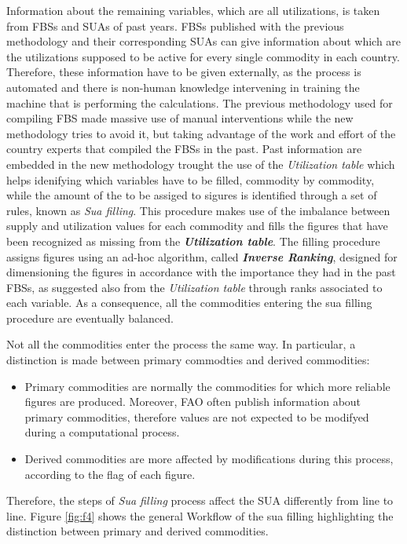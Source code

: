 \documentclass[]{article}
\providecommand{\tightlist}{%
  \setlength{\itemsep}{0pt}\setlength{\parskip}{0pt}}
\begin{document}
Information about the remaining variables, which are all utilizations,
is taken from FBSs and SUAs of past years. FBSs published with the
previous methodology and their corresponding SUAs can give information
about which are the utilizations supposed to be active for every single
commodity in each country.\\
Therefore, these information have to be given externally, as the process
is automated and there is non-human knowledge intervening in training
the machine that is performing the calculations. The previous
methodology used for compiling FBS made massive use of manual
interventions while the new methodology tries to avoid it, but taking
advantage of the work and effort of the country experts that compiled
the FBSs in the past. Past information are embedded in the new
methodology trought the use of the \emph{Utilization table} which helps
idenifying which variables have to be filled, commodity by commodity,
while the amount of the to be assiged to sigures is identified through a
set of rules, known as \emph{Sua filling}. This procedure makes use of
the imbalance between supply and utilization values for each commodity
and fills the figures that have been recognized as missing from the
\textbf{\emph{Utilization table}}. The filling procedure assigns figures
using an ad-hoc algorithm, called \textbf{\emph{Inverse Ranking}},
designed for dimensioning the figures in accordance with the importance
they had in the past FBSs, as suggested also from the \emph{Utilization
table} through ranks associated to each variable. As a consequence, all
the commodities entering the sua filling procedure are eventually
balanced.

Not all the commodities enter the process the same way. In particular, a
distinction is made between primary commodties and derived commodities:

\begin{itemize}
\tightlist
\item
  Primary commodities are normally the commodities for which more
  reliable figures are produced. Moreover, FAO often publish information
  about primary commodities, therefore values are not expected to be
  modifyed during a computational process.
\item
  Derived commodities are more affected by modifications during this
  process, according to the flag of each figure.
\end{itemize}

Therefore, the steps of \emph{Sua filling} process affect the SUA
differently from line to line. Figure \ref{fig:f4} shows the general
Workflow of the sua filling highlighting the distinction between primary
and derived commodities.
\end{document}
